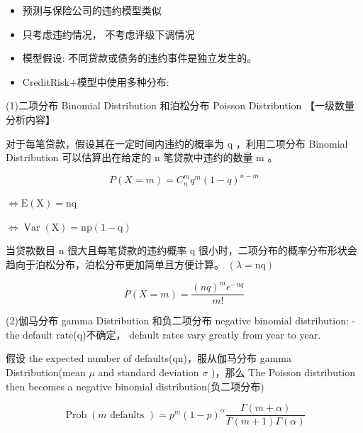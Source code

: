 \begin{itemize}
\item 预测与保险公司的违约模型类似
\end{itemize}

\begin{itemize}
\item 只考虑违约情况， 不考虑评级下调情况
\end{itemize}

\begin{itemize}
\item 模型假设: 不同贷款或债务的违约事件是独立发生的。
\end{itemize}

\begin{itemize}
\item CreditRisk+模型中使用多种分布:
\end{itemize}

(1)二项分布 Binomial Distribution 和泊松分布 Poisson Distribution 【一级数量分析内容】

对于每笔贷款，假设其在一定时间内违约的概率为 \(\mathrm{q}\) ，利用二项分布 Binomial Distribution 可以估算出在给定的 \(\mathrm{n}\) 笔贷款中违约的数量 \(\mathrm{m}\) 。

\[
P\left( {X = m}\right)  = {C}_{n}^{m}{q}^{m}{\left( 1 - q\right) }^{n - m}
\]

\(\Leftrightarrow  \mathrm{E}\left( \mathrm{X}\right)  = \mathrm{{nq}}\)

\(\Leftrightarrow  \operatorname{Var}\left( \mathrm{X}\right)  = \mathrm{{np}}\left( {1 - \mathrm{q}}\right)\)

当贷款数目 \(\mathrm{n}\) 很大且每笔贷款的违约概率 \(\mathrm{q}\) 很小时，二项分布的概率分布形状会趋向于泊松分布，泊松分布更加简单且方便计算。 \(\left( {\lambda  = \mathrm{{nq}}}\right)\)

\[
P\left( {X = m}\right)  = \frac{{\left( nq\right) }^{m}{e}^{-{nq}}}{m!}
\]

(2)伽马分布 gamma Distribution 和负二项分布 negative binomial distribution: - the default rate(q)不确定， default rates vary greatly from year to year.

 假设 the expected number of defaults(qn)，服从伽马分布 gamma Distribution(mean \(\mu\) and standard deviation \(\sigma\) )，那么 The Poisson distribution then becomes a negative binomial distribution(负二项分布)

\[
\operatorname{Prob}\left( {m\text{ defaults }}\right)  = {p}^{m}{\left( 1 - p\right) }^{\alpha }\frac{\Gamma \left( {m + \alpha }\right) }{\Gamma \left( {m + 1}\right) \Gamma \left( \alpha \right) }
\]

